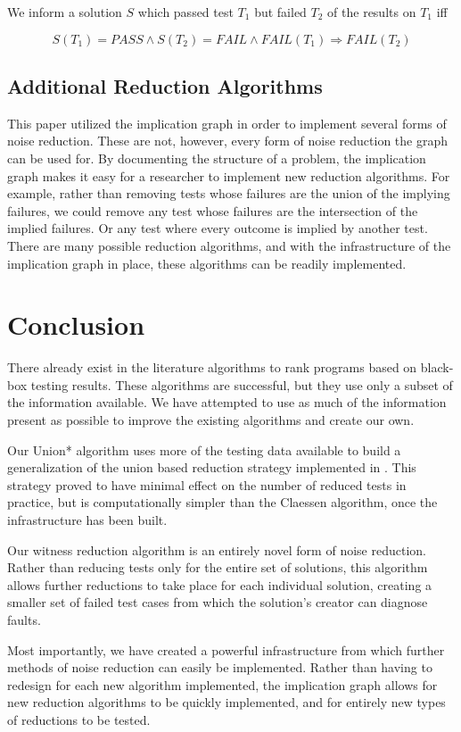 \documentclass[11pt,twoside]{article}
\newcommand\fail{\mathit{FAIL}}
\let\cite=\citep
\begin{document}
\centerline{We inform a solution $S$ which passed test $T_1$ but failed $T_2$ of the results on  $T_1$ iff}
$$ S(T_1) = PASS \wedge S(T_2) = \fail \wedge \fail(T_1) \Rightarrow \fail(T_2)$$

\subsection{Additional Reduction Algorithms}


This paper utilized the implication graph in order to implement several forms of noise reduction. These are not, however, every form of noise reduction the graph can be used for. By documenting the structure of a problem, the implication graph makes it easy for a researcher to implement new reduction algorithms. For example, rather than removing tests whose failures are the union of the implying failures, we could remove any test whose failures are the intersection of the implied failures. Or any test where every outcome is implied by another test. There are many possible reduction algorithms, and with the infrastructure of the implication graph in place, these algorithms can be readily implemented.

\section{Conclusion}
There already exist in the literature algorithms to rank programs based on black-box testing results. These algorithms are successful, but they use only a subset of the information available. We have attempted to use as much of the information present as possible to improve the existing algorithms and create our own.

Our Union* algorithm uses more of the testing data available to build a generalization of the union based reduction strategy implemented in \cite{Claessen}. This strategy proved to have minimal effect on the number of reduced tests in practice, but is computationally simpler than the Claessen algorithm, once the infrastructure has been built.

Our witness reduction algorithm is an entirely novel form of noise reduction. Rather than reducing tests only for the entire set of solutions, this algorithm allows further reductions to take place for each individual solution, creating a smaller set of failed test cases from which the solution's creator can diagnose faults.

Most importantly, we have created a powerful infrastructure from which further methods of noise reduction can easily be implemented. Rather than having to redesign for each new algorithm implemented, the implication graph allows for new reduction algorithms to be quickly implemented, and for entirely new types of reductions to be tested.



\end{document}

